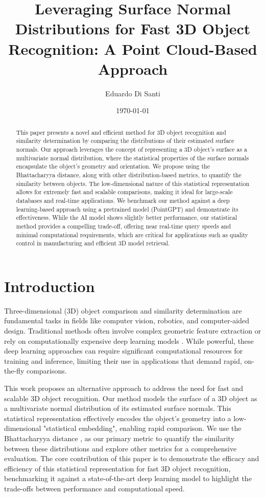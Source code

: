 \documentclass{article}
\title{Leveraging Surface Normal Distributions for Fast 3D Object Recognition: A Point Cloud-Based Approach}
\author{
  Eduardo Di Santi
}
\date{\today}
\begin{document}
\maketitle

\begin{abstract}
    This paper presents a novel and efficient method for 3D object recognition and similarity determination by comparing the distributions of their estimated surface normals. Our approach leverages the concept of representing a 3D object's surface as a multivariate normal distribution, where the statistical properties of the surface normals encapsulate the object's geometry and orientation. We propose using the Bhattacharyya distance, along with other distribution-based metrics, to quantify the similarity between objects. The low-dimensional nature of this statistical representation allows for extremely fast and scalable comparisons, making it ideal for large-scale databases and real-time applications. We benchmark our method against a deep learning-based approach using a pretrained model (PointGPT) and demonstrate its effectiveness. While the AI model shows slightly better performance, our statistical method provides a compelling trade-off, offering near real-time query speeds and minimal computational requirements, which are critical for applications such as quality control in manufacturing and efficient 3D model retrieval.
\end{abstract}

\setlength{\parindent}{20pt}

\section{Introduction}
Three-dimensional (3D) object comparison and similarity determination are fundamental tasks in fields like computer vision, robotics, and computer-aided design. Traditional methods often involve complex geometric feature extraction or rely on computationally expensive deep learning models \cite{relevant_deep_learning_survey}. While powerful, these deep learning approaches can require significant computational resources for training and inference, limiting their use in applications that demand rapid, on-the-fly comparisons.

This work proposes an alternative approach to address the need for fast and scalable 3D object recognition. Our method models the surface of a 3D object as a multivariate normal distribution of its estimated surface normals. This statistical representation effectively encodes the object's geometry into a low-dimensional "statistical embedding", enabling rapid comparison. We use the Bhattacharyya distance \cite{Bhattacharyya}, as our primary metric to quantify the similarity between these distributions and explore other metrics for a comprehensive evaluation. The core contribution of this paper is to demonstrate the efficacy and efficiency of this statistical representation for fast 3D object recognition, benchmarking it against a state-of-the-art deep learning model to highlight the trade-offs between performance and computational speed.
\end{document}
